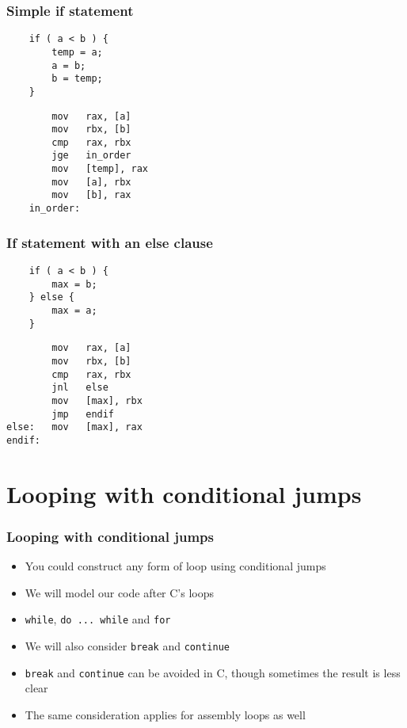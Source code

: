 \documentclass{beamer}
\begin{document}
\begin{frame}[fragile]
    \frametitle{Simple if statement}
\begin{verbatim}
    if ( a < b ) {
        temp = a;
        a = b;
        b = temp;
    }
\end{verbatim}

\begin{verbatim}
        mov   rax, [a]
        mov   rbx, [b]
        cmp   rax, rbx
        jge   in_order
        mov   [temp], rax
        mov   [a], rbx
        mov   [b], rax
    in_order:
\end{verbatim}
\end{frame}

\begin{frame}[fragile]
    \frametitle{If statement with an else clause}
\begin{verbatim}
    if ( a < b ) {
        max = b;
    } else {
        max = a;
    }
\end{verbatim}

\begin{verbatim}
        mov   rax, [a]
        mov   rbx, [b]
        cmp   rax, rbx
        jnl   else
        mov   [max], rbx
        jmp   endif
else:   mov   [max], rax
endif:
\end{verbatim}
\end{frame}

\section{Looping with conditional jumps}

\begin{frame}[fragile]
    \frametitle{Looping with conditional jumps}
    \begin{itemize}
        \item You could construct any form of loop using conditional jumps
        \item We will model our code after C's loops
        \item {\tt while}, {\tt do ... while} and {\tt for}
        \item We will also consider {\tt break} and {\tt continue}
        \item {\tt break} and {\tt continue} can be avoided in C, though
              sometimes the result is less clear
        \item The same consideration applies for assembly loops as well
    \end{itemize}

\end{frame}
\end{document}
